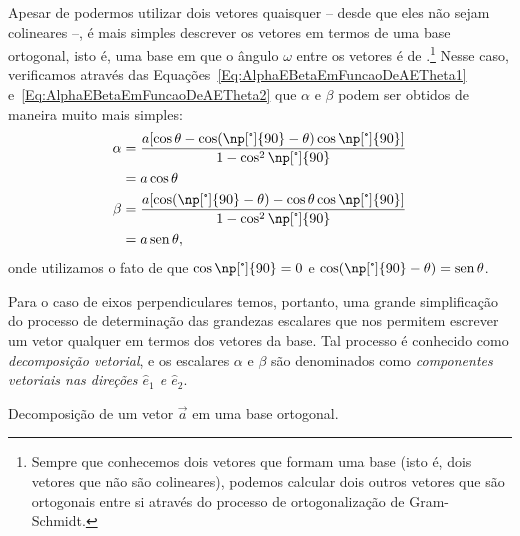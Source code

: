 Apesar de podermos utilizar dois vetores quaisquer -- desde que eles não sejam colineares --, é mais simples descrever os vetores em termos de uma base ortogonal, isto é, uma base em que o ângulo $\omega$ entre os vetores é de .\footnote[][-2cm]{Sempre que conhecemos dois vetores que formam uma base (isto é, dois vetores que não são colineares), podemos calcular dois outros vetores que são ortogonais entre si através do processo de ortogonalização de Gram-Schmidt.} Nesse caso, verificamos através das Equações~\eqref{Eq:AlphaEBetaEmFuncaoDeAETheta1} e~\eqref{Eq:AlphaEBetaEmFuncaoDeAETheta2} que $\alpha$ e $\beta$ podem ser obtidos de maneira muito mais simples:
\begin{align}
    \alpha &= \frac{a[\cos\theta - \cos(\np[\tcdegree]{90}-\theta)\cos\np[\tcdegree]{90}]}{1-\cos^2\np[\tcdegree]{90}} \\
    &=a\cos\theta \\
    \beta &= \frac{a[\cos(\np[\tcdegree]{90} - \theta) - \cos\theta\cos\np[\tcdegree]{90}]}{1-\cos^2\np[\tcdegree]{90}} \\
    &= a\sen\theta,
\end{align}
%
onde utilizamos o fato de que $\cos\np[\tcdegree]{90} = 0$ e $\cos(\np[\tcdegree]{90} - \theta) = \sen\theta$.

Para o caso de eixos perpendiculares temos, portanto, uma grande simplificação do processo de determinação das grandezas escalares que nos permitem escrever um vetor qualquer em termos dos vetores da base. Tal processo é conhecido como \emph{decomposição vetorial}, e os escalares $\alpha$ e $\beta$ são denominados como \emph{componentes vetoriais nas direções $\hat{e}_1$ e $\hat{e}_2$}.

\begin{marginfigure}[-6cm]
\centering
{}
\caption{Decomposição de um vetor $\vec{a}$ em uma base ortogonal. \label{Fig:DecomposicaoEixosOrto}}
\end{marginfigure}

